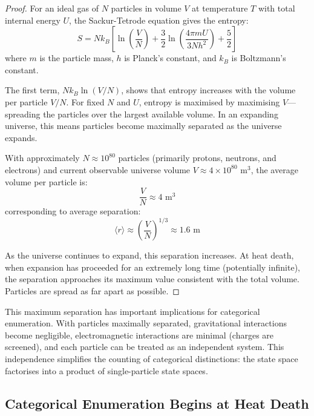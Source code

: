 \documentclass[12pt,a4paper]{article}
\theoremstyle{definition}
\theoremstyle{remark}
\begin{document}
\begin{proof}
For an ideal gas of $N$ particles in volume $V$ at temperature $T$ with total internal energy $U$, the Sackur-Tetrode equation gives the entropy:
\begin{equation}
S = Nk_B \left[ \ln\left(\frac{V}{N}\right) + \frac{3}{2}\ln\left(\frac{4\pi m U}{3Nh^2}\right) + \frac{5}{2} \right]
\end{equation}
where $m$ is the particle mass, $h$ is Planck's constant, and $k_B$ is Boltzmann's constant.

The first term, $Nk_B \ln(V/N)$, shows that entropy increases with the volume per particle $V/N$. For fixed $N$ and $U$, entropy is maximised by maximising $V$—spreading the particles over the largest available volume. In an expanding universe, this means particles become maximally separated as the universe expands.

With approximately $N \approx 10^{80}$ particles (primarily protons, neutrons, and electrons) and current observable universe volume $V \approx 4 \times 10^{80}$ m$^3$, the average volume per particle is:
\begin{equation}
\frac{V}{N} \approx 4 \text{ m}^3
\end{equation}
corresponding to average separation:
\begin{equation}
\langle r \rangle \approx \left(\frac{V}{N}\right)^{1/3} \approx 1.6 \text{ m}
\end{equation}

As the universe continues to expand, this separation increases. At heat death, when expansion has proceeded for an extremely long time (potentially infinite), the separation approaches its maximum value consistent with the total volume. Particles are spread as far apart as possible.
\end{proof}

This maximum separation has important implications for categorical enumeration. With particles maximally separated, gravitational interactions become negligible, electromagnetic interactions are minimal (charges are screened), and each particle can be treated as an independent system. This independence simplifies the counting of categorical distinctions: the state space factorises into a product of single-particle state spaces.

\subsection{Categorical Enumeration Begins at Heat Death}
\end{document}
